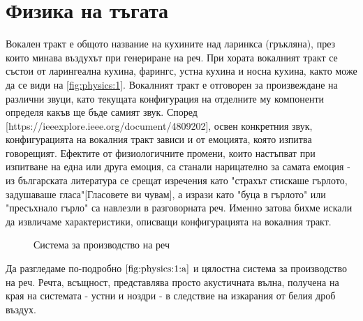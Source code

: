 \documentclass[main.tex]{subfiles}
\begin{document}
\section{Физика на тъгата}
    Вокален тракт е общото название на кухините над ларинкса (гръкляна), през които минава въздухът при генериране на реч.
    При хората вокалният тракт се състои от ларингеална кухина, фарингс, устна кухина и носна кухина, както може да се види на \autoref{fig:physics:1}.
    Вокалният тракт е отговорен за произвеждане на различни звуци, като текущата конфигурация на отделните му компоненти определя какъв ще бъде самият звук.
    Според [https://ieeexplore.ieee.org/document/4809202], освен конкретния звук, конфигурацията на вокалния тракт зависи и от емоцията, която изпитва говорещият. Ефектите от физиологичните промени,
    които настъпват при изпитване на една или друга емоция, са станали нарицателно за самата емоция - из българската литература се срещат изречения като "страхът стискаше гърлото, задушаваше гласа"[Гласовете ви чувам], а 
    изрази като "буца в гърлото" или "пресъхнало гърло" са навлезли в разговорната реч.
    Именно затова бихме искали да извличаме характеристики, описващи конфигурацията на вокалния тракт.
    
    \begin{figure}[ht]%
        \centering
        \begin{changemargin}{0cm}{0cm} 
             \hspace{0.8cm}
        \end{changemargin} 
        \caption{Система за производство на реч}%
        \label{fig:physics:1}
    \end{figure}
    
    Да разгледаме по-подробно $\autoref{fig:physics:1:a}$ и цялостна система за производство на реч.
    Речта, всъщност, представлява просто акустичната вълна, получена на края на системата - устни и ноздри - в следствие на изкарания от белия дроб въздух.
\end{document}
